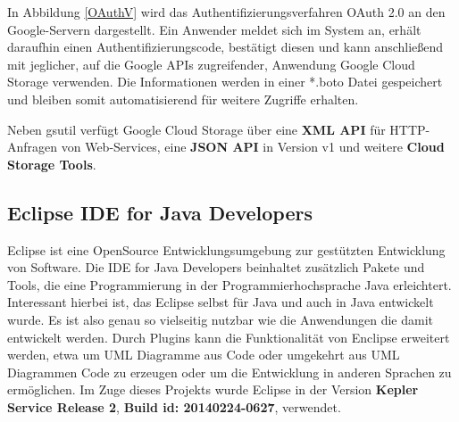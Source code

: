 \documentclass[13pt,a4paper,bibliography=totocnumbered,listof=totocnumbered]{scrartcl}
\begin{document}
In Abbildung \ref{OAuthV} wird das Authentifizierungsverfahren OAuth 2.0 an den Google-Servern dargestellt. Ein Anwender meldet sich im System an, erhält daraufhin einen Authentifizierungscode, bestätigt diesen und kann anschließend mit jeglicher, auf die Google APIs zugreifender, Anwendung Google Cloud Storage verwenden. Die Informationen werden in einer *.boto Datei gespeichert und bleiben somit automatisierend für weitere Zugriffe erhalten. \cite{46}

Neben gsutil verfügt Google Cloud Storage über eine \textbf{XML API} für HTTP-Anfragen von Web-Services, eine \textbf{JSON API} in Version v1 und weitere \textbf{Cloud Storage Tools}.

\subsection{Eclipse IDE for Java Developers}
Eclipse ist eine OpenSource Entwicklungsumgebung zur gestützten Entwicklung von Software. Die IDE for Java Developers beinhaltet zusätzlich Pakete und Tools, die eine Programmierung in der Programmierhochsprache Java erleichtert. Interessant hierbei ist, das Eclipse selbst für Java und auch in Java entwickelt wurde. Es ist also genau so vielseitig nutzbar wie die Anwendungen die damit entwickelt werden. Durch Plugins kann die Funktionalität von Enclipse erweitert werden, etwa um UML Diagramme aus Code oder umgekehrt aus UML Diagrammen Code zu erzeugen oder um die Entwicklung in anderen Sprachen zu ermöglichen. Im Zuge dieses Projekts wurde Eclipse in der Version \textbf{Kepler Service Release 2}, \textbf{Build id: 20140224-0627}, verwendet.
\end{document}

